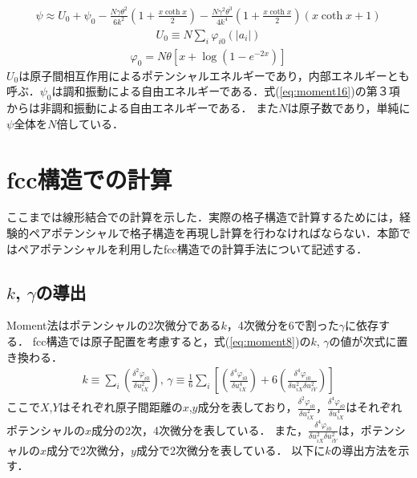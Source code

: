 \begin{eqnarray}
\label{eq:moment16}
\psi \approx U_0+\psi_0-\frac{N\gamma\theta^2}{6k^2}\left(1+\frac{x \coth x}{2}\right)
-\frac{N\gamma^2\theta^3}{4k^4}\left(1+\frac{x \coth x}{2}\right)(x \coth x + 1)
\end{eqnarray}
\begin{eqnarray}
\label{eq:moment17}
U_0\equiv N\sum_i\varphi_{i0}(|a_i|)
\end{eqnarray}
\begin{eqnarray}
\label{eq:moment18}
\varphi_0 = N\theta[x+\log{(1-e^{-2x})}]
\end{eqnarray}
$U_0$は原子間相互作用によるポテンシャルエネルギーであり，内部エネルギーとも呼ぶ．$\psi_0$は調和振動による自由エネルギーである．式(\ref{eq:moment16})の第３項からは非調和振動による自由エネルギーである．
また$N$は原子数であり，単純に$\psi$全体を$N$倍している．
\section{fcc構造での計算}
\label{sec:fcc}
ここまでは線形結合での計算を示した．実際の格子構造で計算するためには，経験的ペアポテンシャルで格子構造を再現し計算を行わなければならない．本節ではペアポテンシャルを利用したfcc構造での計算手法について記述する．

\subsection{$k$, $\gamma$の導出}
Moment法はポテンシャルの2次微分である$k$，4次微分を6で割った$\gamma$に依存する．
fcc構造では原子配置を考慮すると，式(\ref{eq:moment8})の$k$, $\gamma$の値が次式に置き換わる．
\begin{eqnarray}
\label{eq:moment19}
k \equiv 
\sum_i\left( \frac{\delta^2\varphi_{i0}}{\delta u_{iX}^2}\right),\,
\gamma\equiv\frac{1}{6}\sum_i\left[\left( \frac{\delta^4\varphi_{i0}}{\delta u_{iX}^4} \right)
+6\left( \frac{\delta^4\varphi_{i0}}{\delta u_{iX}^2\delta u_{iY}^2} \right)
\right]
\end{eqnarray}
ここで$X$,$Y$はそれぞれ原子間距離の$x$,$y$成分を表しており，$\frac{\delta^2\varphi_{i0}}{\delta u_{iX}^2}$，$\frac{\delta^4\varphi_{i0}}{\delta u_{iX}^4}$はそれぞれポテンシャルの$x$成分の2次，4次微分を表している．
また，$\frac{\delta^4\varphi_{i0}}{\delta u_{iX}^2\delta u_{iY}^2}$は，ポテンシャルの$x$成分で2次微分，$y$成分で2次微分を表している．
以下に$k$の導出方法を示す．

